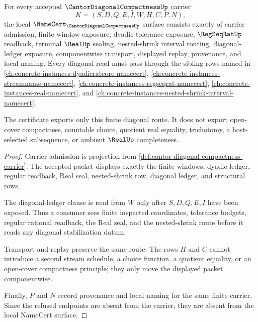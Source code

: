 \begin{theorem}
\label{thm:cantor-diagonal-compactness-namecert-obligations}
For every accepted $\CantorDiagonalCompactnessUp$ carrier
$$
K=(S,D,Q,E,I,W,H,C,P,N),
$$
the local $\NameCert_{\CantorDiagonalCompactnessUp}$ surface consists exactly of carrier admission, finite window exposure, dyadic tolerance exposure, $\RegSeqRatUp$ readback, terminal $\RealUp$ sealing, nested-shrink interval routing, diagonal-ledger exposure, componentwise transport, displayed replay, provenance, and local naming. Every diagonal read must pass through the sibling rows named in \autoref{ch:concrete-instances-dyadicratcore-namecert}, \autoref{ch:concrete-instances-streamname-namecert}, \autoref{ch:concrete-instances-regseqrat-namecert}, \autoref{ch:concrete-instances-real-namecert}, and \autoref{ch:concrete-instances-nested-shrink-interval-namecert}.

The certificate exports only this finite diagonal route. It does not export open-cover compactness, countable choice, quotient real equality, trichotomy, a host-selected subsequence, or ambient $\RealUp$ completeness.
\end{theorem}
\begin{proof}
Carrier admission is projection from \autoref{def:cantor-diagonal-compactness-carrier}. The accepted packet displays exactly the finite windows, dyadic ledger, regular readback, Real seal, nested-shrink row, diagonal ledger, and structural rows.

The diagonal-ledger clause is read from $W$ only after $S,D,Q,E,I$ have been exposed. Thus a consumer sees finite inspected coordinates, tolerance budgets, regular rational readback, the Real seal, and the nested-shrink route before it reads any diagonal stabilization datum.

Transport and replay preserve the same route. The rows $H$ and $C$ cannot introduce a second stream schedule, a choice function, a quotient equality, or an open-cover compactness principle; they only move the displayed packet componentwise.

Finally, $P$ and $N$ record provenance and local naming for the same finite carrier. Since the refused endpoints are absent from the carrier, they are absent from the local NameCert surface.
\end{proof}

